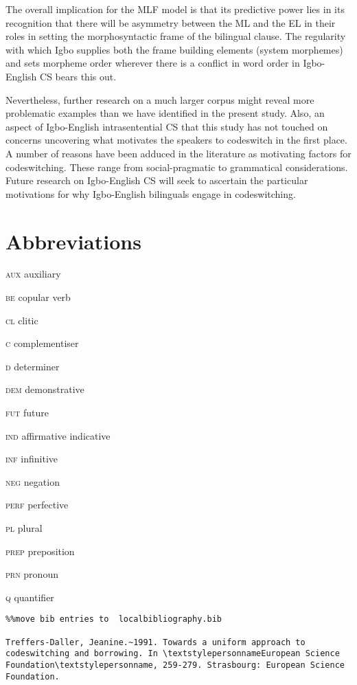 \documentclass[output=paper]{langsci/langscibook}
\begin{document}
The overall implication for the MLF model is that its predictive power lies in its recognition that there will be asymmetry between the ML and the EL in their roles in setting the morphosyntactic frame of the bilingual clause. The regularity with which Igbo supplies both the frame building elements (system morphemes) and sets morpheme order wherever there is a conflict in word order in Igbo-English CS bears this out. 

Nevertheless, further research on a much larger corpus might reveal more problematic examples than we have identified in the present study. Also, an aspect of Igbo-English intrasentential CS that this study has not touched on concerns uncovering what motivates the speakers to codeswitch in the first place. A number of reasons have been adduced in the literature as motivating factors for codeswitching. These range from social-pragmatic to grammatical considerations. Future research on Igbo-English CS will seek to ascertain the particular motivations for why Igbo-English bilinguals engage in codeswitching.

\section{Abbreviations}

\textsc{aux}  auxiliary

\textsc{be}  copular verb

\textsc{cl}  clitic

\textsc{c}  complementiser

\textsc{d}  determiner

\textsc{dem}  demonstrative

\textsc{fut}  future
 
\textsc{ind}    affirmative indicative 

\textsc{inf}  infinitive

\textsc{neg}  negation

\textsc{perf}  perfective

\textsc{pl}  plural

\textsc{prep}  preposition

\textsc{prn}  pronoun

\textsc{q}  quantifier


\begin{verbatim}%%move bib entries to  localbibliography.bib

Treffers-Daller, Jeanine.~1991. Towards a uniform approach to codeswitching and borrowing. In \textstylepersonnameEuropean Science Foundation\textstylepersonname, 259-279. Strasbourg: European Science Foundation.



\end{verbatim}
 

\printbibliography[heading=subbibliography,notkeyword=this]
\end{document}

